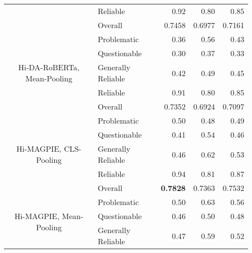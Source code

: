 \begin{table}[htbp]
\begin{longtable}{| c | l | r | r | r |}
                                                          & Reliable           & 0.92               & 0.80            & 0.85            \\\cline{2-5}
                                                          & Overall            & 0.7458             & 0.6977          & 0.7161          \\
        \hline
        \multirow{5}{*}{Hi-DA-RoBERTa, Mean-Pooling}      & Problematic        & 0.36               & 0.56            & 0.43            \\
                                                          & Questionable       & 0.30               & 0.37            & 0.33            \\
                                                          & Generally Reliable & 0.42               & 0.49            & 0.45            \\
                                                          & Reliable           & 0.91               & 0.80            & 0.85            \\\cline{2-5}
                                                          & Overall            & 0.7352             & 0.6924          & 0.7097          \\
        \hline
        \multirow{5}{*}{Hi-MAGPIE, CLS-Pooling}           & Problematic        & 0.50               & 0.48            & 0.49            \\
                                                          & Questionable       & 0.41               & 0.54            & 0.46            \\
                                                          & Generally Reliable & 0.46               & 0.62            & 0.53            \\
                                                          & Reliable           & 0.94               & 0.81            & 0.87            \\\cline{2-5}
                                                          & Overall            & \textbf{0.7828}    & 0.7363          & 0.7532          \\
        \hline
        \multirow{5}{*}{Hi-MAGPIE, Mean-Pooling}          & Problematic        & 0.50               & 0.63            & 0.56            \\
                                                          & Questionable       & 0.46               & 0.50            & 0.48            \\
                                                          & Generally Reliable & 0.47               & 0.59            & 0.52            \\

\end{longtable}
\end{table}
